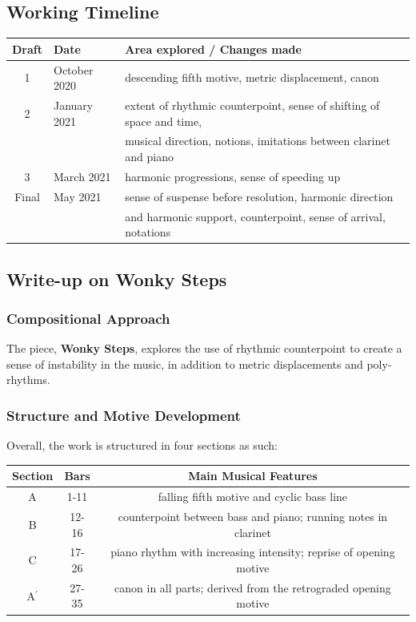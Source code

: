 \documentclass{article}
\begin{document}
\newpage

\subsection{Working Timeline}
\begin{center}
	\def\arraystretch{1.5}
\begin{tabular}{|c|l|l|}
	\hline
	Draft&Date&Area explored / Changes made\\
	\hline
	1&October 2020&
    descending fifth motive, metric displacement, canon\\
	\hline
	2&
    January 2021&extent of rhythmic counterpoint, sense of shifting of space and time,\\
    &&musical direction, notions, imitations between clarinet and piano\\
	\hline
	3&March 2021&harmonic progressions, sense of speeding up\\
	\hline
	Final&May 2021&sense of suspense before resolution, harmonic direction\\
    &&and harmonic support, counterpoint, sense of arrival, notations\\
	\hline
\end{tabular}
\end{center}

\subsection{Write-up on {\bf Wonky Steps}}

\subsubsection{Compositional Approach}
The piece, {\bf Wonky Steps}, explores the use of rhythmic counterpoint to
create a sense of instability in the music, in addition to metric displacements
and poly-rhythms.\\

\subsubsection{Structure and Motive Development}
Overall, the work is structured in four sections as such:\\

\begin{center}
	\def\arraystretch{1.5}
\begin{tabular}{|c|c|c|}
	\hline
	Section&Bars&Main Musical Features\\
	\hline
	A&1-11&falling fifth motive and cyclic bass line\\
	\hline
	B&12-16&counterpoint between bass and piano; running notes in clarinet\\
	\hline
	C&17-26&piano rhythm with increasing intensity; reprise of opening motive\\
	\hline
	A\(^\prime\)&27-35&canon in all parts; derived from the retrograded opening motive\\
	\hline
\end{tabular}
\end{center}
\end{document}
